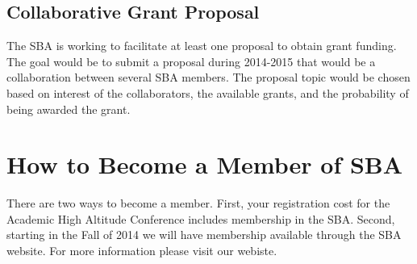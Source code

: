 \documentclass[10pt,foldmark,notumble]{leaflet}
\begin{document}
\subsection{Collaborative Grant Proposal}
The SBA is working to facilitate at least one proposal to obtain grant funding. The goal would be to submit a proposal during 2014-2015 that would be a collaboration between several SBA members. The proposal topic would be chosen based on interest of the collaborators, the available grants, and the probability of being awarded the grant.
\ \\
\section{How to Become a Member of SBA}
There are two ways to become a member.  First, your registration cost for the Academic High Altitude Conference includes membership in the SBA.  Second, starting in the Fall of 2014 we will have membership available through the SBA website.  For more information please visit our webiste.
\end{document}
